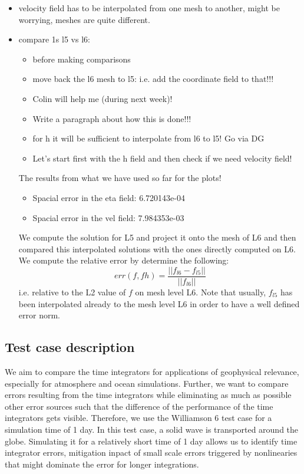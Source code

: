 \documentclass[a4paper, 12pt]{article}
\begin{document}
\begin{itemize}
 \item velocity field has to be interpolated from one mesh to another, might be worrying, meshes are quite different.
 \item compare 1s l5 vs l6:
 \begin{itemize}
  \item before making comparisons
  \item move back the l6 mesh to l5: i.e. add the coordinate field to that!!!
  \item Colin will help me (during next week)!
  \item Write a paragraph about how this is done!!!
  \item for h it will be sufficient to interpolate from l6 to l5! Go via DG
  \item Let's start first with the h field and then check if we need velocity field!
 \end{itemize}

The results from what we have used so far for the plots!
\begin{itemize}
\item Spacial error in the eta field:  6.720143e-04
\item Spacial error in the vel field:  7.984353e-03
\end{itemize}
We compute the solution for L5 and project it onto the mesh of L6 and then compared this interpolated solutions with the ones directly computed on L6. We compute the relative error by determine the following:
\begin{equation}
err(f, fh) =  \frac{||f_{l6} - f_{l5}||}{||f_{l6}||}
\end{equation}
i.e. relative to the L2 value of $f$ on mesh level L6. Note that usually, $f_{l5}$ has been interpolated
already to the mesh level L6 in order to have a well defined error norm.


\end{itemize}

\newpage





\subsection{Test case description}

We aim to compare the time integrators for applications of geophysical relevance, especially for atmosphere and ocean simulations. Further, we want to compare errors resulting from the time integrators while eliminating as much as possible other error sources such that the difference of the performance of the time integrators gets visible. Therefore, we use the Williamson 6 test case for a simulation time of 1 day. In this test case, a solid wave is transported around the globe. Simulating it for a relatively short time of 1 day allows us to identify time integrator errors, mitigation inpact of small scale errors triggered by nonlinearies that might dominate the error for longer integrations.
\end{document}
